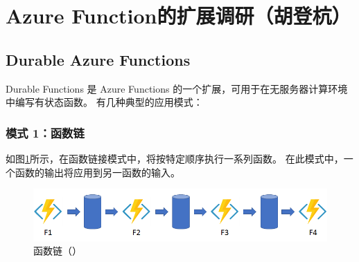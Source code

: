\documentclass[11pt]{article}
\begin{document}
\newpage
\section{Azure Function的扩展调研（胡登杭）}
\subsection{Durable Azure Functions}
Durable Functions 是 Azure Functions 的一个扩展，可用于在无服务器计算环境中编写有状态函数。  
有几种典型的应用模式：
\subsubsection{模式 1：函数链}
如图\ref{fig:model1}所示，在函数链接模式中，将按特定顺序执行一系列函数。 在此模式中，一个函数的输出将应用到另一函数的输入。
\begin{figure}[!htbp]
	\centering
	\includegraphics[width=0.8\linewidth]{figs/model1}
	\caption{函数链（\cite{Durable}）}
	\label{fig:model1}
\end{figure}
\end{document}
